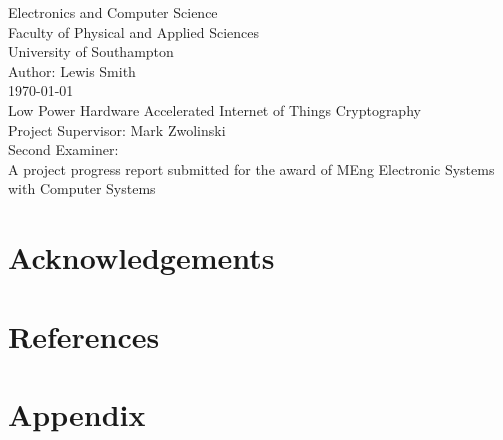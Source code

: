 \documentclass[12pt,twoside,a4paper]{report}
\begin{document}
    
    \begin{titlepage}
    \begin{center}
        \Huge
        Electronics and Computer Science
        \\Faculty of Physical and Applied Sciences
        \\University of Southampton
        \Large
        \\[4cm]Author: Lewis Smith
        \\[1cm]\today
        \\[2cm]Low Power Hardware Accelerated Internet of Things Cryptography
        \\[4cm]Project Supervisor: Mark Zwolinski
        \\Second Examiner:
        \\[4cm]A project progress report submitted for the award of MEng Electronic Systems with Computer Systems
        
    \end{center}
    \end{titlepage}
    
    \begin{abstract}
    
    \lipsum[1-2]
    
    \end{abstract}
    
    \tableofcontents
    
    \chapter*{Acknowledgements}
    
    \chapter*{References}
    
    \chapter*{Appendix}
    
\end{document}
